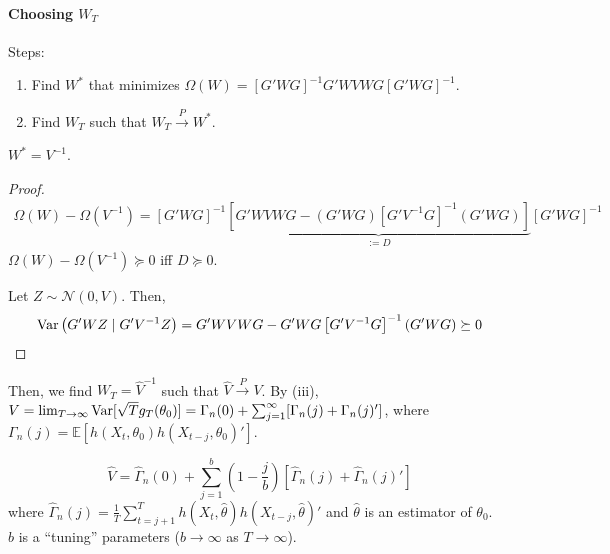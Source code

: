 \documentclass[11pt]{elegantbook}
\begin{document}
\paragraph*{Choosing $W_T$}
Steps:
\begin{enumerate}
    \item Find $W^*$ that minimizes $\Omega(W)=\left[G'WG\right]^{-1}G'WVWG\left[G'WG\right]^{-1}$.
    \item Find $W_T$ such that $W_T\stackrel{P}{\longrightarrow} W^*$.
\end{enumerate}
\begin{claim}
    $W^*=V^{-1}$.
\end{claim}
\begin{proof}
    \begin{equation}
        \begin{aligned}
            \Omega(W)-\Omega(V^{-1})=\left[G'WG\right]^{-1}\underbrace{\left[G'WVWG-(G'WG)\left[G'V^{-1}G\right]^{-1}(G'WG)\right]}_{:=D}\left[G'WG\right]^{-1}
        \end{aligned}
        \nonumber
    \end{equation}
    $\Omega(W)-\Omega(V^{-1})\succeq 0$ iff $D\succeq 0$.

    Let $Z\sim \mathcal{N}\left(0,V\right)$. Then,
    \begin{equation}
        \begin{aligned}
            \textnormal{Var}\left(G'WZ\mid G'V^{-1}Z\right)=G'WVWG-G'WG\left[G'V^{-1}G\right]^{-1}(G'WG)\succeq 0
        \end{aligned}
        \nonumber
    \end{equation}
\end{proof}
Then, we find $W_T=\hat{V}^{-1}$ such that $\hat{V}\stackrel{P}{\longrightarrow}V$. By (iii), $V=\lim_{T\rightarrow \infty}\textnormal{Var}[\sqrt{T}g_T(\theta_0)]=\Gamma_n(0)+\sum_{j=1}^\infty[\Gamma_n(j)+\Gamma_n(j)']$, where $\Gamma_n(j)=\mathbb{E}[h(X_t,\theta_0)h(X_{t-j},\theta_0)']$.

\begin{proposition}
    $$\hat{V}=\hat{\Gamma}_n(0)+\sum_{j=1}^b\left(1-\frac{j}{b}\right)[\hat{\Gamma}_n(j)+\hat{\Gamma}_n(j)']$$
    where $\hat{\Gamma}_n(j)=\frac{1}{T}\sum_{t=j+1}^Th(X_t,\hat{\theta})h(X_{t-j},\hat{\theta})'$ and $\hat{\theta}$ is an estimator of $\theta_0$.\\
    $b$ is a ``tuning'' parameters ($b \rightarrow \infty$ as $T \rightarrow \infty$).
\end{proposition}
\end{document}
